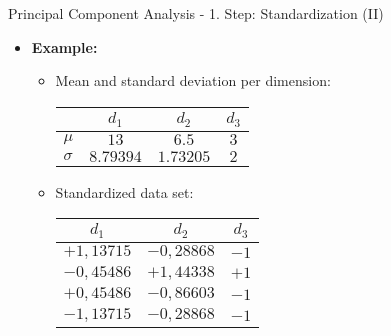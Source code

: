 \begin{frame}{Principal Component Analysis - 1. Step: Standardization (II)}
	\begin{itemize}
		\item \textbf{Example:}
		      \begin{itemize}
			      \item Mean and standard deviation per dimension: \\
			            \vspace{3mm}
			            \begin{center}
				            \centering
				            \begin{tabular}{|l|c|c|c|}
					            \hline
					                     & $d_1$     & $d_2$     & $d_3$
					            \\\hline
					            $\mu$    & $13$      & $6.5$     & $3$
					            \\\hline
					            $\sigma$ & $8.79394$ & $1.73205$ &
					            $2$
					            \\\hline
				            \end{tabular}
			            \end{center}
			            \vspace{3mm}
			      \item Standardized data set: \\
			            \vspace{3mm}
			            \begin{center}
				            \centering
				            \begin{tabular}{|c|c|c|}
					            \hline
					            $d_1$      & $d_2$      & $d_3$
					            \\\hline
					            $+1,13715$ & $-0,28868$ & $-1$
					            \\\hline
					            $-0,45486$ & $+1,44338$ & $+1$
					            \\\hline
					            $+0,45486$ & $-0,86603$ & $-1$
					            \\\hline
					            $-1,13715$ & $-0,28868$ & $-1$
					            \\\hline
				            \end{tabular}
			            \end{center}
		      \end{itemize}
	\end{itemize}
\end{frame}

